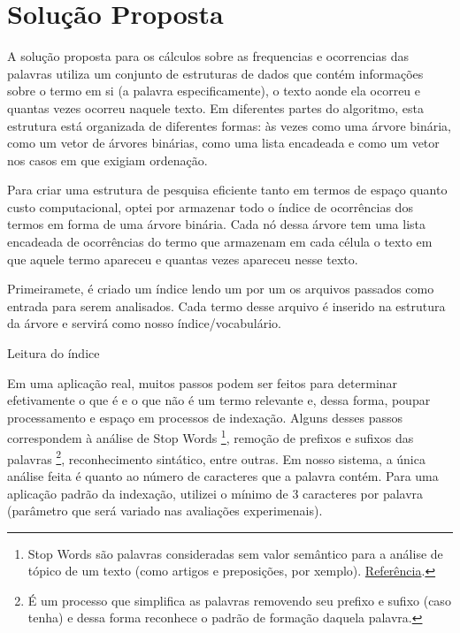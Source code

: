 \documentclass[12pt]{article}
\begin{document}
\section{Solução Proposta}
\label{solucao_proposta}

A solução proposta para os cálculos sobre as frequencias e ocorrencias das
palavras utiliza um conjunto de estruturas de dados que contém informações sobre
o termo em si (a palavra especificamente), o texto aonde ela ocorreu e quantas
vezes ocorreu naquele texto. Em diferentes partes do algoritmo, esta estrutura está
organizada de diferentes formas: às vezes como uma árvore binária, como um vetor
de árvores binárias, como uma lista encadeada e como um vetor nos casos em que
exigiam ordenação.

Para criar uma estrutura de pesquisa eficiente tanto em termos de espaço quanto
custo computacional, optei por armazenar todo o índice de ocorrências dos termos
em forma de uma árvore binária. Cada nó dessa árvore tem uma lista encadeada de
ocorrências do termo que armazenam em cada célula o texto em que aquele termo
apareceu e quantas vezes apareceu nesse texto.

Primeiramete, é criado um índice lendo um por um os arquivos passados como
entrada para serem analisados. Cada termo desse arquivo é inserido na estrutura
da árvore e servirá como nosso índice/vocabulário.

\begin{algorithm}[h!]
\begin{footnotesize}
\caption{Leitura do índice}
\end{footnotesize}
\end{algorithm}

Em uma aplicação real, muitos passos podem ser feitos para determinar
efetivamente o que é e o que não é um termo relevante e, dessa forma, poupar
processamento e espaço em processos de indexação. Alguns desses passos
correspondem à análise de Stop Words \footnote{Stop Words são palavras consideradas sem valor
semântico para a análise de tópico de um texto (como artigos e preposições, por
xemplo). \href{http://searchenginewatch.com/2156061}{Referência}.}, remoção de
prefixos e sufixos das palavras \footnote{É um processo que simplifica as
palavras removendo seu prefixo e sufixo (caso tenha) e dessa forma reconhece o
padrão de formação daquela palavra.}, reconhecimento sintático, entre outras. 
Em nosso sistema, a única análise feita é quanto ao número de caracteres que a 
palavra contém. Para uma aplicação padrão da indexação, utilizei o mínimo de 3 
caracteres por palavra (parâmetro que será variado nas avaliações experimenais).
\end{document}
